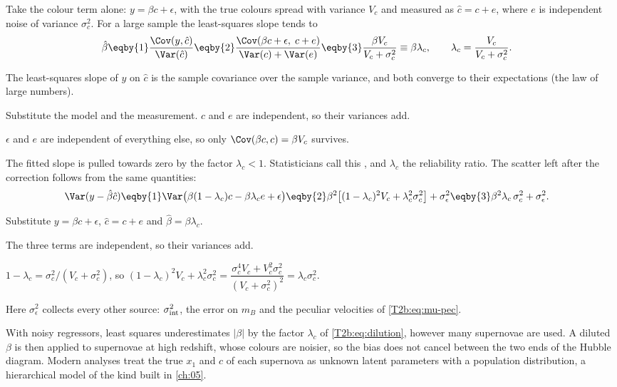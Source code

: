 Take the colour term alone: $y=\beta c+\epsilon$, with the true colours spread with variance $V_c$ and measured as $\hat c=c+e$, where $e$ is independent noise of variance $\sigma_c^2$. For a large sample the least-squares slope tends to
\begin{align}
  \hat\beta
  &\eqby{1}\frac{\Cov(y,\hat c)}{\Var(\hat c)}
  \eqby{2}\frac{\Cov(\beta c+\epsilon,\;c+e)}{\Var(c)+\Var(e)}
  \eqby{3}\frac{\beta V_c}{V_c+\sigma_c^2}
  \equiv\beta\lambda_c ,
  \qquad \lambda_c=\frac{V_c}{V_c+\sigma_c^2}.
  \label{T2b:eq:dilution}
\end{align}
\begin{explain}
  \item The least-squares slope of $y$ on $\hat c$ is the sample covariance over the sample variance, and both converge to their expectations (the law of large numbers).
  \item Substitute the model and the measurement. $c$ and $e$ are independent, so their variances add.
  \item $\epsilon$ and $e$ are independent of everything else, so only $\Cov(\beta c,c)=\beta V_c$ survives.
\end{explain}
The fitted slope is pulled towards zero by the factor $\lambda_c<1$. Statisticians call this , and $\lambda_c$ the reliability ratio. The scatter left after the correction follows from the same quantities:
\begin{align}
  \Var(y-\hat\beta\hat c)
  &\eqby{1}\Var\big(\beta(1-\lambda_c)c-\beta\lambda_c e+\epsilon\big)
  \eqby{2}\beta^2\big[(1-\lambda_c)^2V_c+\lambda_c^2\sigma_c^2\big]+\sigma_\epsilon^2
  \eqby{3}\beta^2\lambda_c\,\sigma_c^2+\sigma_\epsilon^2 .
  \label{T2b:eq:resid-var}
\end{align}
\begin{explain}
  \item Substitute $y=\beta c+\epsilon$, $\hat c=c+e$ and $\hat\beta=\beta\lambda_c$.
  \item The three terms are independent, so their variances add.
  \item $1-\lambda_c=\sigma_c^2/(V_c+\sigma_c^2)$, so $(1-\lambda_c)^2V_c+\lambda_c^2\sigma_c^2=\dfrac{\sigma_c^4V_c+V_c^2\sigma_c^2}{(V_c+\sigma_c^2)^2}=\lambda_c\sigma_c^2$.
\end{explain}
Here $\sigma_\epsilon^2$ collects every other source: $\sigma_{\rm int}^2$, the error on $m_B$ and the peculiar velocities of \eqref{T2b:eq:mu-pec}.

\begin{pitfall}
With noisy regressors, least squares underestimates $|\beta|$ by the factor $\lambda_c$ of \eqref{T2b:eq:dilution}, however many supernovae are used. A diluted $\beta$ is then applied to supernovae at high redshift, whose colours are noisier, so the bias does not cancel between the two ends of the Hubble diagram. Modern analyses treat the true $x_1$ and $c$ of each supernova as unknown latent parameters with a population distribution, a hierarchical model of the kind built in \cref{ch:05}.
\end{pitfall}

